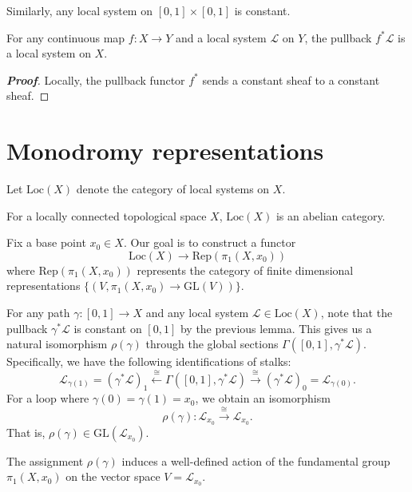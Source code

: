 Similarly, any local system on $[0,1] \times [0,1]$ is constant.

\begin{lemma}
For any continuous map $f: X \rightarrow Y$ and a local system $\mathcal{L}$ on $Y$, the pullback $f^* \mathcal{L}$ is a local system on $X$.
\end{lemma}

\begin{proof}[\textbf{Proof}]
Locally, the pullback functor $f^*$ sends a constant sheaf to a constant sheaf.
\end{proof}

\section{Monodromy representations}

Let $\mathrm{Loc}(X)$ denote the category of local systems on $X$.

\begin{proposition}
For a locally connected topological space $X$, $\mathrm{Loc}(X)$ is an abelian category.
\end{proposition}

Fix a base point $x_0 \in X$. Our goal is to construct a functor
\[ \mathrm{Loc}(X) \longrightarrow \mathrm{Rep}(\pi_1(X, x_0)) \]
where $\mathrm{Rep}(\pi_1(X, x_0))$ represents the category of finite dimensional representations $\{ (V,\pi_1(X, x_0) \rightarrow \mathrm{GL}(V)) \}$.

For any path $\gamma: [0,1] \rightarrow X$ and any local system $\mathcal{L} \in \mathrm{Loc}(X)$, note that the pullback $\gamma^* \mathcal{L}$ is constant on $[0,1]$ by the previous lemma. This gives us a natural isomorphism $\rho(\gamma)$ through the global sections $\Gamma([0,1], \gamma^*\mathcal{L})$. Specifically, we have the following identifications of stalks:
\[ \mathcal{L}_{\gamma(1)} = (\gamma^*\mathcal{L})_1 \xleftarrow{\cong} \Gamma([0,1], \gamma^*\mathcal{L}) \xrightarrow{\cong} (\gamma^*\mathcal{L})_0 = \mathcal{L}_{\gamma(0)}. \]
For a loop where $\gamma(0) = \gamma(1) = x_0$, we obtain an isomorphism
\[ \rho(\gamma): \mathcal{L}_{x_0} \xrightarrow{\cong} \mathcal{L}_{x_0}. \]
That is, $\rho(\gamma) \in \mathrm{GL}(\mathcal{L}_{x_0})$.


\begin{lemma}
The assignment $\rho(\gamma)$ induces a well-defined action of the fundamental group $\pi_1(X, x_0)$ on the vector space $V = \mathcal{L}_{x_0}$.
\end{lemma}

